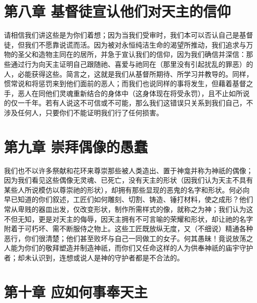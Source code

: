 
\section{第八章 基督徒宣认他们对天主的信仰}

请相信我们讲这些是为你们着想；因为当我们受审时，我们本可以否认自己是基督徒，但我们不愿靠说谎而活。因为被对永恒纯洁生命的渴望所推动，我们追求与万物的圣父和造物主同在的居所，并急于宣认我们的信仰，因为我们确信并深信：那些通过行为向天主证明自己跟随祂、喜爱与祂同在（那里没有引起扰乱的罪恶）的人，必能获得这些。简言之，这就是我们从基督所期待、所学习并教导的。同样，惯常说和将惩罚来到他们面前的恶人；而我们也说同样的事将发生，但藉着基督之手，恶人在同他们灵魂重新结合的身体中（这身体现在将受永罚），且不止如所说的仅一千年。若有人说这不可信或不可能，那么我们这错误只关系到我们自己，不涉及任何人，只要你们不能证明我们行了任何损害。\par


\section{第九章 崇拜偶像的愚蠢}

我们也不以许多祭献和花环来尊崇那些被人类造出、置于神龛并称为神祇的偶像；因为我们看见这些偶像无灵魂、已死亡，没有天主的形状（因我们认为天主不具有某些人所说模仿以尊崇祂的形状），却拥有那些显现的恶鬼的名字和形状。何必向早已知道的你们叙述，工匠们如何雕刻、切割、铸造、锤打材料，使之成形？他们常从卑贱的器皿出发，仅改变形状，制作所需样式的像，就称之为神；我们认为这不但无知，更是对天主的侮辱，因天主拥有不可言喻的荣耀和形状，却让祂的名字附着于可朽坏、需不断服侍之物上。这些工匠既放纵无度，又（不细说）精通各种恶行，你们很清楚；他们甚至败坏与自己一同做工的女子。何其愚昧！竟说放荡之人能为你们的敬拜塑造并制造神祇，而你们又任命这样的人为供奉神祇的庙宇守护者；却未认识到，连想或说人是神的守护者都是不合法的。\par


\section{第十章 应如何事奉天主}

